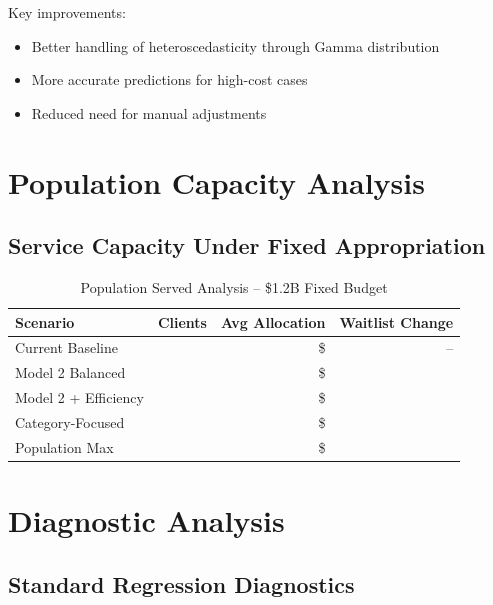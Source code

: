 Key improvements:
\begin{itemize}
    \item Better handling of heteroscedasticity through Gamma distribution
    \item More accurate predictions for high-cost cases
    \item Reduced need for manual adjustments
\end{itemize}

\section{Population Capacity Analysis}

\subsection{Service Capacity Under Fixed Appropriation}

\begin{table}[h]
\centering
\caption{Population Served Analysis -- \$1.2B Fixed Budget}
\begin{tabular}{lrrr}
\toprule
\textbf{Scenario} & \textbf{Clients} & \textbf{Avg Allocation} & \textbf{Waitlist Change} \\
\midrule
Current Baseline & \ModelTwoPopcurrentbaselineClients{} & \$\ModelTwoPopcurrentbaselineAvgAlloc{} & -- \\
Model 2 Balanced & \ModelTwoPopmodelbalancedClients{} & \$\ModelTwoPopmodelbalancedAvgAlloc{} & \ModelTwoPopmodelbalancedWaitlistChange{} \\
Model 2 + Efficiency & \ModelTwoPopmodelefficiencyClients{} & \$\ModelTwoPopmodelefficiencyAvgAlloc{} & \ModelTwoPopmodelefficiencyWaitlistChange{} \\
Category-Focused & \ModelTwoPopcategoryfocusedClients{} & \$\ModelTwoPopcategoryfocusedAvgAlloc{} & \ModelTwoPopcategoryfocusedWaitlistChange{} \\
Population Max & \ModelTwoPoppopulationmaximizedClients{} & \$\ModelTwoPoppopulationmaximizedAvgAlloc{} & \ModelTwoPoppopulationmaximizedWaitlistChange{} \\
\bottomrule
\end{tabular}
\end{table}

\section{Diagnostic Analysis}

\subsection{Standard Regression Diagnostics}


